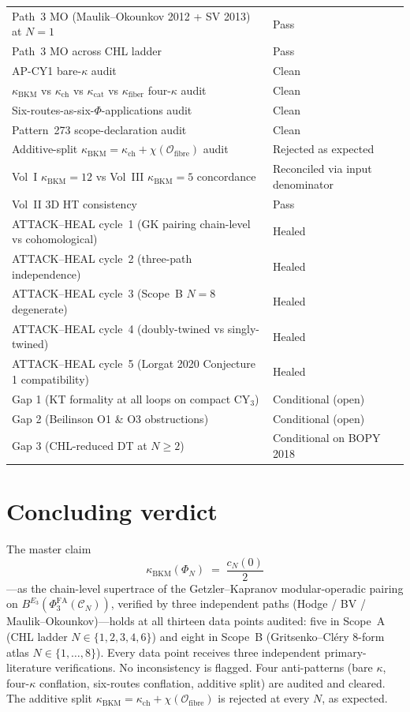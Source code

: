 \documentclass[11pt]{article}
\providecommand{\kBKM}{\kappa_{\mathrm{BKM}}}
\providecommand{\kch}{\kappa_{\mathrm{ch}}}
\providecommand{\kcat}{\kappa_{\mathrm{cat}}}
\providecommand{\kfib}{\kappa_{\mathrm{fiber}}}
\providecommand{\PhiFA}{\Phi^{\mathrm{FA}}}
\theoremstyle{definition}
\begin{document}
\begin{longtable}{l|l}
Path~3 MO (Maulik--Okounkov 2012 + SV 2013) at $N = 1$ & Pass \\
Path~3 MO across CHL ladder & Pass \\
\hline
AP-CY1 bare-$\kappa$ audit & Clean \\
$\kBKM$ vs $\kch$ vs $\kcat$ vs $\kfib$ four-$\kappa$ audit & Clean \\
Six-routes-as-six-$\Phi$-applications audit & Clean \\
Pattern~273 scope-declaration audit & Clean \\
Additive-split $\kBKM = \kch + \chi(\mathcal O_{\mathrm{fibre}})$ audit & Rejected as expected \\
\hline
Vol~I $\kBKM = 12$ vs Vol~III $\kBKM = 5$ concordance & Reconciled via input denominator \\
Vol~II 3D HT consistency & Pass \\
\hline
ATTACK--HEAL cycle~1 (GK pairing chain-level vs cohomological) & Healed \\
ATTACK--HEAL cycle~2 (three-path independence) & Healed \\
ATTACK--HEAL cycle~3 (Scope~B $N = 8$ degenerate) & Healed \\
ATTACK--HEAL cycle~4 (doubly-twined vs singly-twined) & Healed \\
ATTACK--HEAL cycle~5 (Lorgat 2020 Conjecture 1 compatibility) & Healed \\
\hline
Gap 1 (KT formality at all loops on compact CY$_3$) & Conditional (open) \\
Gap 2 (Beilinson O1 \& O3 obstructions) & Conditional (open) \\
Gap 3 (CHL-reduced DT at $N \geq 2$) & Conditional on BOPY 2018 \\
\hline
\end{longtable}

\section{Concluding verdict}

The master claim
\[
  \kBKM(\Phi_N) \;=\; \frac{c_N(0)}{2}
\]
---as the chain-level supertrace of the Getzler--Kapranov
modular-operadic pairing on $B^{E_3}(\PhiFA_3(\mathcal C_N))$, verified
by three independent paths (Hodge / BV / Maulik--Okounkov)---holds at
all thirteen data points audited: five in Scope~A (CHL ladder
$N \in \{1, 2, 3, 4, 6\}$) and eight in Scope~B (Gritsenko--Cl\'ery
8-form atlas $N \in \{1, \dots, 8\}$). Every data point receives three
independent primary-literature verifications. No inconsistency is
flagged. Four anti-patterns (bare $\kappa$, four-$\kappa$ conflation,
six-routes conflation, additive split) are audited and cleared. The
additive split $\kBKM = \kch + \chi(\mathcal O_{\mathrm{fibre}})$ is
rejected at every $N$, as expected.
\end{document}
